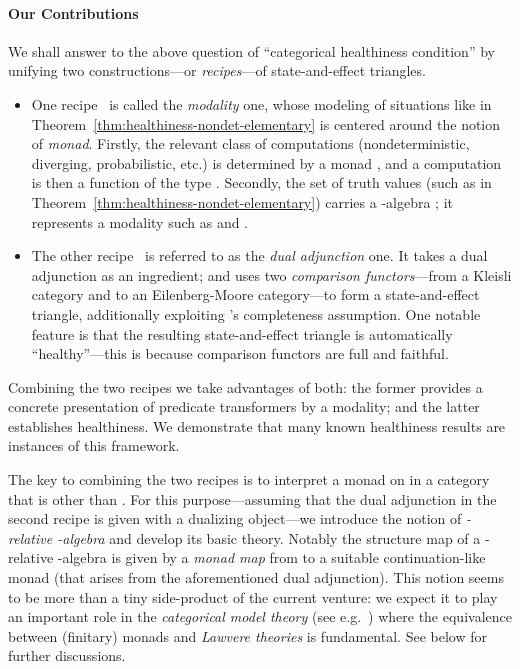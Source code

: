 \documentclass[9pt, preprint]{sigplanconf}
\theoremstyle{theorem}
\theoremstyle{definition}
\begin{document}
\paragraph{Our Contributions}
We shall answer to the above question of ``categorical healthiness
condition'' by unifying two constructions---or \emph{recipes}---of
state-and-effect triangles.
\begin{itemize}
 \item One recipe~\cite{Hasuo14,Hasuo15TCS} is called the \emph{modality} one,
       whose modeling of situations like in
       Theorem~\ref{thm:healthiness-nondet-elementary} is centered
       around the notion of \emph{monad}. Firstly,
       the relevant class of
       computations (nondeterministic, diverging,
       probabilistic, etc.) is determined by a monad , and
       a computation is then a function of the type . Secondly,
              the set  of truth values (such as 
       in Theorem~\ref{thm:healthiness-nondet-elementary})
carries a -algebra
       ; it represents a modality such
       as  and .
 \item The other recipe~\cite{Jacobs15CALCO} is referred to as the
       \emph{dual adjunction} one. It takes a dual adjunction
       \quad
       as an ingredient; and uses two \emph{comparison functors}---from
       a Kleisli category and to an Eilenberg-Moore category---to form a
       state-and-effect triangle, additionally exploiting 's
       completeness assumption. One notable feature is that the
       resulting state-and-effect triangle is automatically
       ``healthy''---this is because comparison functors are full and
       faithful.
\end{itemize}
Combining the two recipes we take advantages of both: the former
provides a concrete presentation of predicate transformers by a
modality; and the latter establishes healthiness.  We demonstrate that
many known healthiness results are instances of this framework.

The key to combining the two recipes is to interpret a
monad  on  in a category  that is other than
. For this purpose---assuming that the dual adjunction in the
second recipe is given with a dualizing
object---we introduce the notion of \emph{-relative -algebra}
and develop its basic theory. Notably the structure map of a -relative -algebra  is given by a \emph{monad map} from  to a suitable
continuation-like monad (that arises from the aforementioned dual
adjunction). This notion seems to be more than a tiny side-product of the
current venture: we expect it to play an important role in the
\emph{categorical model theory} (see e.g.~\cite{AdamekR94,LackP09,MakkaiP89}) where the
equivalence between (finitary) monads and \emph{Lawvere theories} is
fundamental. See below for further discussions.
\end{document}
